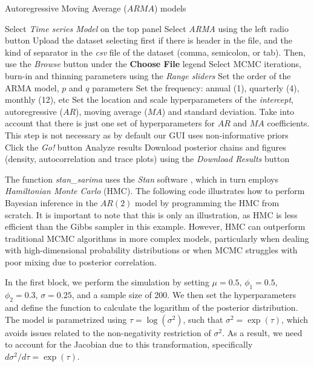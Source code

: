 \begin{algorithm}[h!]
	\caption{Autoregressive Moving Average ($ARMA$) models}\label{alg:ARMA}
	\begin{algorithmic}[1]  		 			
		\State Select \textit{Time series Model} on the top panel
		\State Select \textit{ARMA} using the left radio button
		\State Upload the dataset selecting first if there is header in the file, and the kind of separator in the \textit{csv} file of the dataset (comma, semicolon, or tab). Then, use the \textit{Browse} button under the \textbf{Choose File} legend
		\State Select MCMC iterations, burn-in and thinning parameters using the \textit{Range sliders}
		\State Set the order of the ARMA model, $p$ and $q$ parameters
		\State Set the frequency: annual (1), quarterly (4), monthly (12), etc
		\State Set the location and scale hyperparameters of the \textit{intercept}, autoregressive ($AR$), moving average ($MA$) and standard deviation. Take into account that there is just one set of hyperparameters for $AR$ and $MA$ coefficients. This step is not necessary as by default our GUI uses non-informative priors
		\State Click the \textit{Go!} button
		\State Analyze results
		\State Download posterior chains and figures (density, autocorrelation and trace plots) using the \textit{Download Results} button
	\end{algorithmic} 
\end{algorithm}

The function \textit{stan\_sarima} uses the \textit{Stan} software \cite{Stan2024}, which in turn employs \textit{Hamiltonian Monte Carlo} (HMC). The following code illustrates how to perform Bayesian inference in the $AR(2)$ model by programming the HMC from scratch. It is important to note that this is only an illustration, as HMC is less efficient than the Gibbs sampler in this example. However, HMC can outperform traditional MCMC algorithms in more complex models, particularly when dealing with high-dimensional probability distributions or when MCMC struggles with poor mixing due to posterior correlation.

In the first block, we perform the simulation by setting $\mu=0.5$, $\phi_1=0.5$, $\phi_2=0.3$, $\sigma=0.25$, and a sample size of 200. We then set the hyperparameters and define the function to calculate the logarithm of the posterior distribution. The model is parametrized using $\tau = \log(\sigma^2)$, such that $\sigma^2=\exp(\tau)$, which avoids issues related to the non-negativity restriction of $\sigma^2$. As a result, we need to account for the Jacobian due to this transformation, specifically $d\sigma^2/d\tau = \exp(\tau)$.


